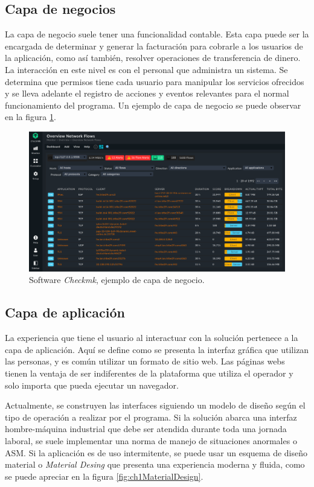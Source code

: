 \subsection{Capa de negocios}
La capa de negocio suele tener una funcionalidad contable.
Esta capa puede ser la encargada de determinar y generar la facturación para cobrarle a los usuarios de la aplicación, como así también, resolver operaciones de transferencia de dinero.
La interacción en este nivel es con el personal que administra un sistema.
Se determina que permisos tiene cada usuario para manipular los servicios ofrecidos y se lleva adelante el registro de acciones y eventos relevantes para el normal funcionamiento del programa.
Un ejemplo de capa de negocio se puede observar en la figura \ref{fig:ch1EjemploNegocio}.

\begin{figure}[h]
	\centering
	\includegraphics[width=\textwidth]{./Figures/ch1EjemploNegocio.png}
	\caption{Software \emph{Checkmk}, ejemplo de capa de negocio. \citep{WEBSITE:checkmk}}
	\label{fig:ch1EjemploNegocio}
\end{figure}


\subsection{Capa de aplicación}
La experiencia que tiene el usuario al interactuar con la solución pertenece a la capa de aplicación.
Aquí se define como se presenta la interfaz gráfica que utilizan las personas, y es común utilizar un formato de sitio web.
Las páginas webs tienen la ventaja de ser indiferentes de la plataforma que utiliza el operador y solo importa que pueda ejecutar un navegador.

Actualmente, se construyen las interfaces siguiendo un modelo de diseño según el tipo de operación a realizar por el programa.
Si la solución abarca una interfaz hombre-máquina industrial que debe ser atendida durante toda una jornada laboral, se suele implementar una norma de manejo de situaciones anormales o ASM.
Si la aplicación es de uso intermitente, se puede usar un esquema de diseño material o \emph{Material Desing} que presenta una experiencia moderna y fluida, como se puede apreciar en la figura \ref{fig:ch1MaterialDesign}.


